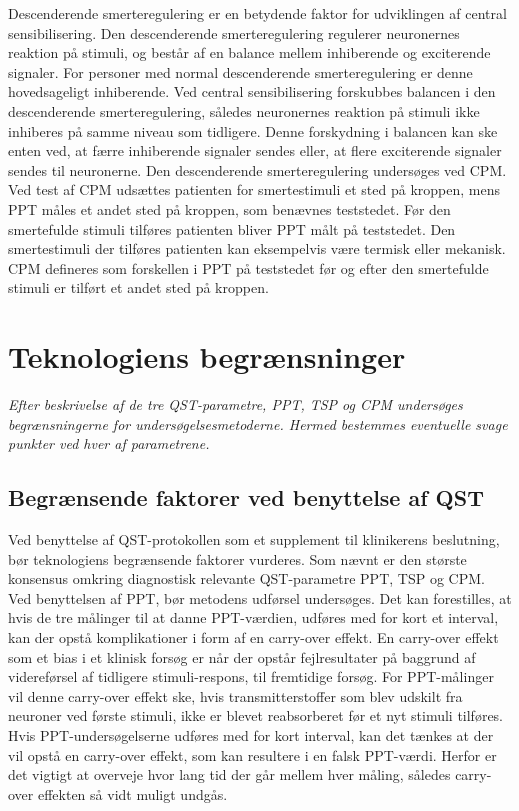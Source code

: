 Descenderende smerteregulering er en betydende faktor for udviklingen af central sensibilisering. Den descenderende smerteregulering regulerer neuronernes reaktion på stimuli, og består af en balance mellem inhiberende og exciterende signaler. For personer med normal descenderende smerteregulering er denne hovedsageligt inhiberende. Ved central sensibilisering forskubbes balancen i den descenderende smerteregulering, således neuronernes reaktion på stimuli ikke inhiberes på samme niveau som tidligere. Denne forskydning i balancen kan ske enten ved, at færre inhiberende signaler sendes eller, at flere exciterende signaler sendes til neuronerne. \citep{Arendt-Nielsen2015b} Den descenderende smerteregulering undersøges ved CPM. Ved test af CPM udsættes patienten for smertestimuli et sted på kroppen, mens PPT måles et andet sted på kroppen, som benævnes teststedet. Før den smertefulde stimuli tilføres patienten bliver PPT målt på teststedet. \citep{Petersen2016} Den smertestimuli der tilføres patienten kan eksempelvis være termisk eller mekanisk. CPM defineres som forskellen i PPT på teststedet før og efter den smertefulde stimuli er tilført et andet sted på kroppen. \citep{Petersen2015} 

\section{Teknologiens begrænsninger}
\textit{Efter beskrivelse af de tre QST-parametre, PPT, TSP og CPM undersøges begrænsningerne for undersøgelsesmetoderne. Hermed bestemmes eventuelle svage punkter ved hver af parametrene.}

\subsection{Begrænsende faktorer ved benyttelse af QST}
Ved benyttelse af QST-protokollen som et supplement til klinikerens beslutning, bør teknologiens begrænsende faktorer vurderes. Som nævnt er den største konsensus omkring diagnostisk relevante QST-parametre PPT, TSP og CPM. \\
Ved benyttelsen af PPT, bør metodens udførsel undersøges. Det kan forestilles, at hvis de tre målinger til at danne PPT-værdien, udføres med for kort et interval, kan der opstå komplikationer i form af en carry-over effekt. En carry-over effekt som et bias i et klinisk forsøg er når der opstår fejlresultater på baggrund af videreførsel af tidligere stimuli-respons, til fremtidige forsøg. For PPT-målinger vil denne carry-over effekt ske, hvis transmitterstoffer som blev udskilt fra neuroner ved første stimuli, ikke er blevet reabsorberet før et nyt stimuli tilføres. \citep{Martini2012} Hvis PPT-undersøgelserne udføres med for kort interval, kan det tænkes at der vil opstå en carry-over effekt, som kan resultere i en falsk PPT-værdi. Herfor er det vigtigt at overveje hvor lang tid der går mellem hver måling, således carry-over effekten så vidt muligt undgås. \citep{Porta2008} 

